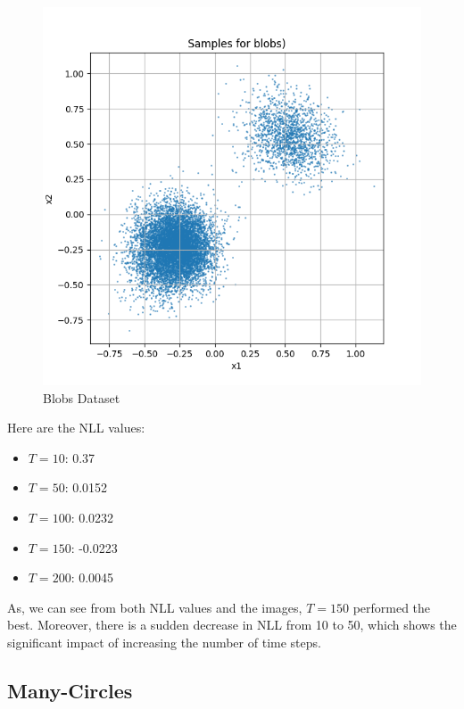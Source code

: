 \documentclass[a4paper,12pt]{article}
\begin{document}
\begin{figure}[H]
\begin{minipage}{0.3\textwidth}
  \end{minipage}
  \begin{minipage}{0.3\textwidth}
      \centering
      \includegraphics[width=\linewidth]{"images/Samples for ddpm_2_200_0.0001_0.02_blobs.png"}
  \end{minipage}

  \caption{Blobs Dataset}
\end{figure}

Here are the NLL values:
\begin{itemize}
  \item $T = 10$: 0.37
  \item $T = 50$: 0.0152
  \item $T = 100$: 0.0232
  \item $T = 150$: -0.0223
  \item $T = 200$: 0.0045
\end{itemize}

As, we can see from both NLL values and the images, $T = 150$ performed the best. Moreover, there is a sudden decrease in NLL from 10 to 50, which shows the significant impact of increasing the number of time steps.

\clearpage
\subsection*{Many-Circles}
\end{document}
